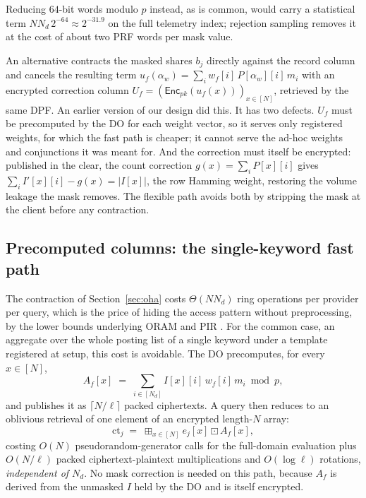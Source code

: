 \documentclass[a4paper,fleqn]{cas-sc}
\newcommand{\Enc}{\mathsf{Enc}}
\newcommand{\bplus}{\boxplus}
\newcommand{\bdot}{\boxdot}
\begin{document}
Reducing $64$-bit words modulo $p$ instead, as is common, would carry a
statistical term $N N_d\,2^{-64}\approx2^{-31.9}$ on the full
telemetry index; rejection sampling removes it at the cost of about two PRF
words per mask value.

\begin{remark}
\label{rem:whyenc}
An alternative contracts the masked shares $b_j$ directly against the record
column and cancels the resulting term
$u_f(\alpha_w)=\sum_i w_f[i]\,P[\alpha_w][i]\,m_i$ with an encrypted correction
column $U_f=(\Enc_{pk}(u_f(x)))_{x\in[N]}$, retrieved by the same DPF. An
earlier version of our design did this. It has two defects. $U_f$ must be precomputed by
the DO for each weight vector, so it serves only registered weights, for which
the fast path is cheaper; it cannot serve the ad-hoc weights and conjunctions
it was meant for. And the correction must itself be encrypted: published in the
clear, the count correction $g(x)=\sum_iP[x][i]$ gives
$\sum_iI'[x][i]-g(x)=|I[x]|$, the row Hamming weight, restoring the volume
leakage the mask removes. The flexible path avoids both by stripping the mask
at the client before any contraction.
\end{remark}

\subsection{Precomputed columns: the single-keyword fast path}
\label{sec:fast}
The contraction of Section~\ref{sec:oha} costs $\Theta(N N_d)$ ring operations
per provider per query, which is the price of hiding the access pattern
without preprocessing, by the lower bounds underlying ORAM and PIR
\citep{goldreich1996software,beimel2000reducing}. For the common case, an
aggregate over the whole posting list of a single keyword under a template
registered at setup, this cost is avoidable. The DO precomputes, for every
$x\in[N]$,
\[
A_f[x] \;=\; \sum_{i\in[N_d]} I[x][i]\,w_f[i]\,m_i \bmod p ,
\]
and publishes it as $\lceil N/\ell\rceil$ packed ciphertexts. A query then
reduces to an oblivious retrieval of one element of an encrypted length-$N$
array:
\[
\text{ct}_j \;=\; \bplus_{x\in[N]} e_j[x]\bdot A_f[x],
\]
costing $O(N)$ pseudorandom-generator calls for the full-domain evaluation
plus $O(N/\ell)$ packed ciphertext-plaintext multiplications and
$O(\log \ell)$ rotations, \emph{independent of $N_d$}. No mask correction is
needed on this path, because $A_f$ is derived from the unmasked $I$ held by
the DO and is itself encrypted.
\end{document}
